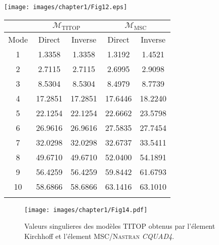  \begin{minipage}{\columnwidth}
  \begin{minipage}[b]{0.3\columnwidth}
    \centering
    \texttt{[image: images/chapter1/Fig12.eps]}
    \label{fig:plate_mesh_fr}
  \end{minipage}
  \hfill
  \begin{minipage}[b]{0.64\columnwidth}
    \centering
    \begin{tabular}{ccccc}
\hline
\multicolumn{1}{c}{} & \multicolumn{2}{c}{$\mathbf{\mathcal{M}}_{\mathrm{TITOP}}$} & \multicolumn{2}{c}{$\mathbf{\mathcal{M}}_{\mathrm{MSC}}$} \\ \hline
 Mode & Direct & Inverse & Direct & Inverse \\ \hline
1 & 1.3358 & 1.3358 & 1.3192 & 1.4521 \\
2 & 2.7115 & 2.7115 & 2.6995 & 2.9098 \\
3 & 8.5304 & 8.5304 & 8.4979 & 8.7739 \\
4 & 17.2851 & 17.2851 & 17.6446 & 18.2240 \\
5 & 22.1254 & 22.1254 & 22.6662 & 23.5798 \\
6 & 26.9616 & 26.9616 & 27.5835 & 27.7454 \\
7 & 32.0298 & 32.0298 & 32.6737 & 33.5411 \\
8 & 49.6710 & 49.6710 & 52.0400 & 54.1891 \\
9 & 56.4259 & 56.4259 & 59.8442 & 61.6793 \\
10 & 58.6866 & 58.6866 & 63.1416 & 63.1010 \\ 
 \hline 
\label{tab:plate_com_fr} 
\end{tabular}
    \end{minipage}
  \end{minipage}

\begin{figure}[!ht]
\centering
\texttt{[image: images/chapter1/Fig14.pdf]} %
\caption{Valeurs singulieres des mod\`eles TITOP obtenus par l'\'element Kirchhoff et l'\'element \textsc{MSC/Nastran} \textit{CQUAD4}.} 
\label{fig:sigma_plate_fr}
\end{figure}

